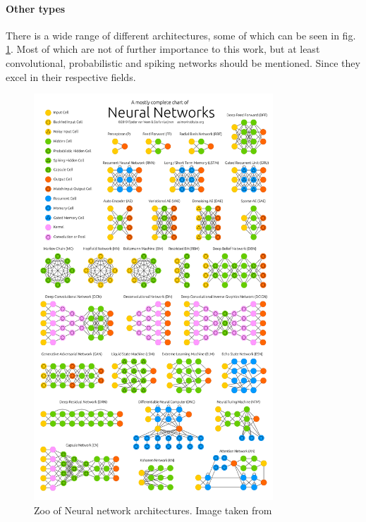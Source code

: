 			\paragraph{Other types}
				There is a wide range of different architectures, some of which can be seen in fig. \ref{Fig:NNZoo}. Most of which are not of further importance to this work, but at least convolutional, probabilistic and spiking networks should be mentioned. Since they excel in their respective fields.
			
			\begin{figure}
				\includegraphics[width=0.8\textwidth]{./images/NeuralNetworkZoo.png}
				\caption{Zoo of Neural network architectures. Image taken from \cite{ImgNNZoo}}
				\label{Fig:NNZoo}
			\end{figure}
